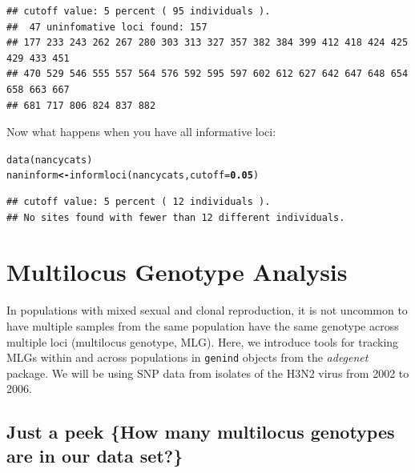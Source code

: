 \documentclass[letterpaper]{article}\usepackage[]{graphicx}\usepackage[]{color}
\makeatletter
\newcommand{\hlnum}[1]{\textcolor[rgb]{0.502,0,0.502}{\textbf{#1}}}%
\newcommand{\hlstd}[1]{\textcolor[rgb]{0,0,0}{#1}}%
\newcommand{\hlkwb}[1]{\textcolor[rgb]{0.502,0.502,0.753}{\textbf{#1}}}%
\newcommand{\hlkwc}[1]{\textcolor[rgb]{0,0.502,0.753}{#1}}%
\newcommand{\hlkwd}[1]{\textcolor[rgb]{0,0.267,0.4}{#1}}%
\newenvironment{kframe}{%
 \def\at@end@of@kframe{}%
 \ifinner\ifhmode%
  \def\at@end@of@kframe{\end{minipage}}%
  \begin{minipage}{\columnwidth}%
 \fi\fi%
 \def\FrameCommand##1{\hskip\@totalleftmargin \hskip-\fboxsep
 \colorbox{shadecolor}{##1}\hskip-\fboxsep
     \hskip-\linewidth \hskip-\@totalleftmargin \hskip\columnwidth}%
 \MakeFramed {\advance\hsize-\width
   \@totalleftmargin\z@ \linewidth\hsize
   \@setminipage}}%
 {\par\unskip\endMakeFramed%
 \at@end@of@kframe}
\newenvironment{knitrout}{}{} %
\newcommand{\tab}{\hspace*{1em}}
\makeatother
\begin{document}
\begin{knitrout}\footnotesize
{}\color{fgcolor}\begin{kframe}
\begin{verbatim}
## cutoff value: 5 percent ( 95 individuals ).
##  47 uninfomative loci found: 157 
## 177 233 243 262 267 280 303 313 327 357 382 384 399 412 418 424 425 429 433 451 
## 470 529 546 555 557 564 576 592 595 597 602 612 627 642 647 648 654 658 663 667 
## 681 717 806 824 837 882
\end{verbatim}
\end{kframe}
\end{knitrout}

Now what happens when you have all informative loci:
\begin{knitrout}\footnotesize
{}\color{fgcolor}\begin{kframe}
\begin{alltt}
\hlkwd{data}\hlstd{(nancycats)}
\hlstd{naninform} \hlkwb{<-} \hlkwd{informloci}\hlstd{(nancycats,} \hlkwc{cutoff} \hlstd{=} \hlnum{0.05}\hlstd{)}
\end{alltt}
\begin{verbatim}
## cutoff value: 5 percent ( 12 individuals ).
## No sites found with fewer than 12 different individuals.
\end{verbatim}
\end{kframe}
\end{knitrout}


\section{Multilocus Genotype Analysis}\label{mlg}

\tab\tab In populations with mixed sexual and clonal reproduction, it is not uncommon to have multiple samples from the same population have the same genotype across multiple loci (multilocus genotype, MLG). Here, we introduce tools for tracking MLGs within and across populations in \texttt{genind} objects from the \textit{adegenet} package. We will be using SNP data from isolates of the H3N2 virus from 2002 to 2006.
\subsection{Just a peek \{How many multilocus genotypes are in our data set?\}}\label{mlg:mlg}
\end{document}
